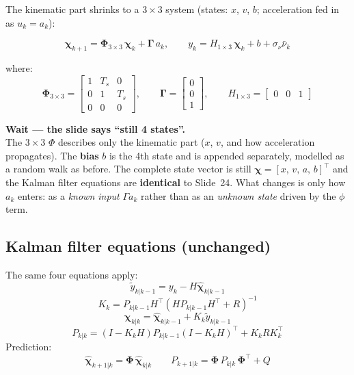 \documentclass[12pt, a4paper]{article}
\begin{document}
The kinematic part shrinks to a $3 \times 3$ system
(states: $x$, $v$, $b$; acceleration fed in as $u_k = a_k$):

\[
  \boldsymbol{\chi}_{k+1} = \boldsymbol{\Phi}_{3\times 3}\,\boldsymbol{\chi}_k
    + \boldsymbol{\Gamma}\,a_k,
  \qquad
  y_k = H_{1\times 3}\,\boldsymbol{\chi}_k + b + \sigma_\nu\bar{\nu}_k
\]

where:
\[
\boldsymbol{\Phi}_{3\times 3} =
\begin{bmatrix} 1 & T_s & 0 \\ 0 & 1 & T_s \\ 0 & 0 & 0 \end{bmatrix},
\qquad
\boldsymbol{\Gamma} =
\begin{bmatrix} 0 \\ 0 \\ 1 \end{bmatrix},
\qquad
H_{1\times 3} =
\begin{bmatrix} 0 & 0 & 1 \end{bmatrix}
\]

\begin{notebox}
  \textbf{Wait --- the slide says ``still 4 states''.}\\
  The $3\times 3$ $\Phi$ describes only the kinematic part
  ($x$, $v$, and how acceleration propagates).
  The \textbf{bias} $b$ is the 4th state and is appended separately,
  modelled as a random walk as before.
  The complete state vector is still
  $\boldsymbol{\chi} = [x,\, v,\, a,\, b]^\top$ and the Kalman
  filter equations are \textbf{identical} to Slide~24.
  What changes is only how $a_k$ enters: as a \emph{known input}
  $\Gamma a_k$ rather than as an \emph{unknown state} driven by the
  $\phi$ term.
\end{notebox}

\subsection*{Kalman filter equations (unchanged)}

The same four equations apply:
\[
  \tilde{y}_{k|k-1} = y_k - H\hat{\boldsymbol{\chi}}_{k|k-1}
\]
\[
  K_k = P_{k|k-1}H^\top\!\left(HP_{k|k-1}H^\top + R\right)^{-1}
\]
\[
  \hat{\boldsymbol{\chi}}_{k|k}
    = \hat{\boldsymbol{\chi}}_{k|k-1} + K_k\tilde{y}_{k|k-1}
\]
\[
  P_{k|k} = (I - K_kH)P_{k|k-1}(I-K_kH)^\top + K_kRK_k^\top
\]
Prediction:
\[
  \hat{\boldsymbol{\chi}}_{k+1|k} = \boldsymbol{\Phi}\,\hat{\boldsymbol{\chi}}_{k|k}
  \qquad
  P_{k+1|k} = \boldsymbol{\Phi}\,P_{k|k}\,\boldsymbol{\Phi}^\top + Q
\]
\end{document}
